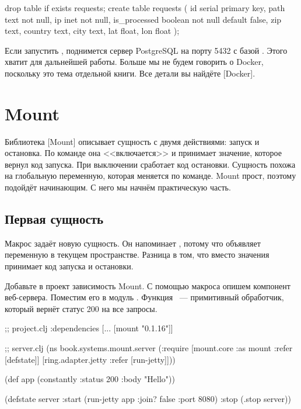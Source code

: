 \begin{sql}
drop table if exists requests;
create table requests (
    id            serial primary key,
    path          text not null,
    ip            inet not null,
    is_processed  boolean not null default false,
    zip           text,
    country       text,
    city          text,
    lat           float,
    lon           float
);
\end{sql}

\fi

Если запустить , поднимется сервер Postgre\-SQL на порту
5432 с базой . Этого хватит для дальнейшей работы. Больше мы не
будем говорить о Docker, поскольку это тема отдельной книги. Все детали вы
найдёте [Docker].

\section{Mount}


Библиотека [Mount]
описывает сущность с двумя действиями: запуск и остановка. По команде она
<<включается>> и принимает значение, которое вернул код запуска. При выключении
сработает код остановки. Сущность похожа на глобальную переменную, которая
меняется по команде. Mount прост, поэтому подойдёт начинающим. С него мы начнём
практическую часть.

\subsection{Первая сущность}


Макрос  задаёт новую сущность. Он напоминает ,
потому что объявляет переменную в текущем пространстве. Разница в том, что
вместо значения  принимает код запуска и остановки.

Добавьте в проект зависимость Mount. С помощью макроса опишем компонент
веб-сервера. Поместим его в модуль . Функция ~---
примитивный обработчик, который вернёт статус 200 на все запросы.

\ifnarrow

\begin{clojure}
;; project.clj
:dependencies [... [mount "0.1.16"]]

;; server.clj
(ns book.systems.mount.server
  (:require
   [mount.core :as mount
    :refer [defstate]]
   [ring.adapter.jetty
    :refer [run-jetty]]))

(def app (constantly
           {:status 200 :body "Hello"}))

(defstate server
  :start (run-jetty app
           {:join? false :port 8080})
  :stop (.stop server))
\end{clojure}

